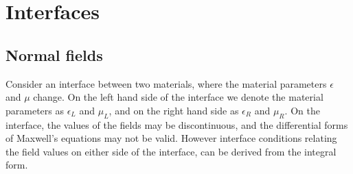\section{Interfaces}

% 



\subsection{Normal fields}

Consider an interface between two materials, where the material parameters $\epsilon$ and $\mu$ change. On the left hand side of the interface we denote the material parameters as $\epsilon_L$ and $\mu_L$, and on the right hand side as $\epsilon_R$ and $\mu_R$. On the interface, the values of the fields may be discontinuous, and the differential forms of Maxwell's equations may not be valid. However interface conditions relating the field values on either side of the interface, can be derived from the integral form.

